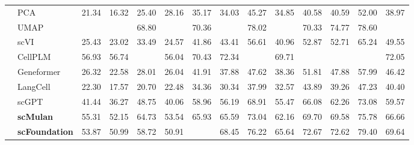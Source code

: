 \begin{table}[htbp]
\begin{tabular}{llcccccccccccc}
      & PCA      &   21.34 &   16.32 &   25.40 &   28.16 &   35.17 &   34.03 &   45.27 &   34.85 &   40.58 &   40.59 &   52.00 &   38.97  \\
      & UMAP      & \cellcolor{gray!25}{62.61} & \cellcolor{gray!25}{62.15} &   68.80 & \cellcolor{gray!25}{65.56} &   70.36 & \cellcolor{gray!25}{75.49} &   78.02 & \cellcolor{gray!25}{74.48} &   70.33 &   74.77 &   78.60 & \cellcolor{gray!25}{73.06}  \\
      & scVI      &   25.43 &   23.02 &   33.49 &   24.57 &   41.86 &   43.41 &   56.61 &   40.96 &   52.87 &   52.71 &   65.24 &   49.55  \\
      & CellPLM      &   56.93 &   56.74 & \cellcolor{gray!25}{69.01} &   56.04 &   70.43 &   72.34 & \cellcolor{gray!25}{78.42} &   69.71 & \cellcolor{gray!25}{74.24} & \cellcolor{gray!25}{75.04} & \cellcolor{gray!25}{80.50} &   72.05  \\
      & Geneformer      &   26.32 &   22.58 &   28.01 &   26.04 &   41.91 &   37.88 &   47.62 &   38.36 &   51.81 &   47.88 &   57.99 &   46.42  \\
      & LangCell      &   22.30 &   17.57 &   20.70 &   22.48 &   34.36 &   30.34 &   37.99 &   32.57 &   43.89 &   39.26 &   47.23 &   40.40  \\
      & scGPT      &   41.44 &   36.27 &   48.75 &   40.06 &   58.96 &   56.19 &   68.91 &   55.47 &   66.08 &   62.26 &   73.08 &   59.57  \\
      & \cellcolor{gray!25}\textbf{scMulan}      &   55.31 &   52.15 &   64.73 &   53.54 &   65.93 &   65.59 &   73.04 &   62.16 &   69.70 &   69.58 &   75.78 &   66.66  \\
      & \cellcolor{gray!25}\textbf{scFoundation}      &   53.87 &   50.99 &   58.72 &   50.91 & \cellcolor{gray!25}{70.49} &   68.45 &   76.22 &   65.64 &   72.67 &   72.62 &   79.40 &   69.64  \\
    \midrule

    \end{tabular}
  \end{table}

